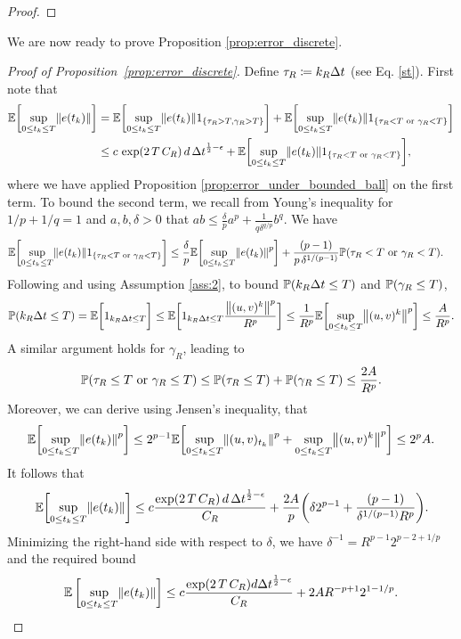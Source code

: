\documentclass[11pt, twoside]{report}
\begin{document}
\begin{proof}
\end{proof}
We are now ready to prove Proposition \ref{prop:error_discrete}.
\begin{proof}[Proof of Proposition~\ref{prop:error_discrete}]
Define $\tau_R\coloneq k_R{\Delta t}$ (see Eq. \ref{st}). 
 First note that
    \begin{align*}
        \EE\bp{ \sup_{0\leq t_k\leq T} \norm{e(t_k)}}  
        &= \EE\bp{\sup_{0\leq t_k\leq T} \norm{e(t_k)} 1_{\ens{\tau_R>T, \gamma_R>T}}} +  \EE\bp{ \sup_{0\leq t_k\leq T} \norm{e(t_k)} 1_{\ens{\tau_R< T \text{ or } \gamma_R<T}}} \\
        &\leq c \,\exp\pa{2\,T\, C_R} \,d \,\deltat^{\frac12-\epsilon} + \EE\bp{ \sup_{0\leq t_k\leq T} \norm{e(t_k)} 1_{\ens{\tau_R< T \text{ or } \gamma_R<T}}},
    \end{align*}
    where we have applied Proposition \ref{prop:error_under_bounded_ball} on the first term. To bound the second term, we recall from Young's inequality for $1/p+1/q=1$ and $a,b,\delta>0$ that $ab \leq \frac{\delta}{p} a^p + \frac{1}{q\delta^{q/p}} b^q.$ We have
    \begin{align*}
        &\EE\bp{ \sup_{0\leq t_k\leq T} \norm{e(t_k)} 1_{\ens{\tau_R< T \text{ or } \gamma_R<T}}}
        \leq  \frac{\delta}{p}\EE\bp{ \sup_{0\leq t_k\leq T} \norm{e(t_k)}^p} + \frac{(p-1)}{p\,\delta^{1/(p-1)}} \PP\pa{\tau_R< T \text{ or } \gamma_R<T}.
    \end{align*}   
Following \cite{higham2002strong} and using Assumption \ref{ass:2}, to bound $\mathbb{P}(k_R{\Delta t} \leq T)$ and $\PP\pa{\gamma_R \leq T}$, 
$$
\PP(k_R \deltat \leq T) = \EE\biggl[ 1_{k_R\deltat \leq T}\biggr] \leq \EE\biggl[ 1_{k_R\deltat \leq T} \frac{\norm{(u,v)^k}^p}{R^p}\biggr]
\leq \frac{1}{R^p} \EE\biggl[\sup_{0\leq t_k \leq T} \norm{(u,v)^k}^p\biggr] \leq \frac{A}{R^p}.
$$
A similar argument holds for $\gamma_R$, leading to
    $$\PP\pa{\tau_R \leq T \text{ or } \gamma_R \leq T} \leq
    \PP\pa{\tau_R \leq T} + \PP\pa{\gamma_R \leq T} \leq \frac{2A}{R^p}.
    $$
Moreover, we can derive using Jensen's inequality, that
    $$
    \EE\biggl[\sup_{0\leq t_k\leq T} \norm{e(t_k)}^p\biggr] \leq 2^{p-1}\EE\bp{\sup_{0\leq t_k\leq T} \norm{(u,v)_{t_k}}^p + \sup_{0\leq t_k\leq T} \norm{(u,v)^k}^p} \leq 2^p A.
    $$
    It follows that 
$$
\EE\bp{ \sup_{0\leq t_k\leq T} \norm{e(t_k)} } \leq  c\frac{ \exp(2\,T \,C_R) \,d \,\deltat^{\frac12-\epsilon}}{C_R} + \frac{2A}{p} \pa{ \delta 2^{p-1}   +  \frac{(p-1)}{\delta^{1/(p-1)}R^p}}.
$$
Minimizing the right-hand side with respect to $\delta$, we have $\delta^{-1} = R^{p-1} 2^{p-2+1/p}$ and the required bound
$$
\EE\left[ \sup_{0\leq t_k\leq T} \norm{e(t_k)} \right] \leq  c\frac{ \exp\pa{2\,T\, C_R} d \deltat^{\frac12-\epsilon} }{C_R} +  2A R^{-p+1} 2^{1-1/p}.
$$
\end{proof}
\end{document}
